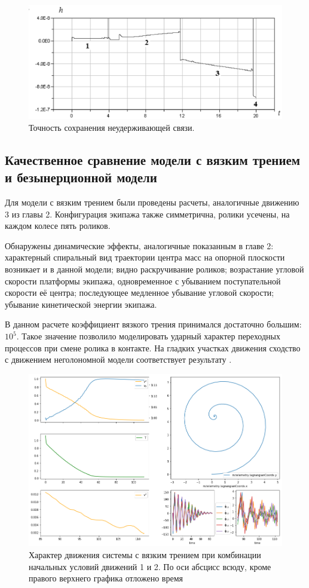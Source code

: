 \begin{figure}[htb]
\centerline{\includegraphics[width=15cm]{content/parts/3_friction/nd/Figure21.eps}}
\caption{Точность сохранения неудерживающей связи.}
\label{fig2}
\end{figure}

\subsection{Качественное сравнение модели с вязким трением и безынерционной модели}

Для модели с вязким трением были проведены расчеты, аналогичные движению 3 из главы 2. Конфигурация экипажа также симметрична, ролики усечены, на каждом колесе пять роликов.

Обнаружены динамические эффекты, аналогичные показанным в главе 2: характерный спиральный вид траектории центра масс на опорной плоскости возникает и в данной модели; видно раскручивание роликов; возрастание угловой скорости платформы экипажа, одновременное с убыванием поступательной скорости её центра; последующее медленное убывание угловой скорости; убывание кинетической энергии экипажа.

В данном расчете коэффициент вязкого трения принимался достаточно большим: $10^{5}$. Такое значение позволило моделировать ударный характер переходных процессов при смене ролика в контакте. На гладких участках движения сходство с движением неголономной модели соответствует результату \cite{karapetyan1981negolonom}.

\begin{figure}[htb]
\centerline{\includegraphics[width=\linewidth]{content/pic/new/visc_3_100.png}}
\caption{Характер движения системы с вязким трением при комбинации начальных условий движений 1 и 2. По оси абсцисс всюду, кроме правого верхнего графика отложено время}
\label{fig2}
\end{figure}
